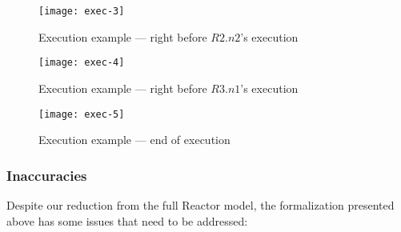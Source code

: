 \begin{figure}[!htbp]
\centering
\texttt{[image: exec-3]}
\caption{Execution example --- right before $R2.n2$'s execution}
\label{fig:exec-3}
\texttt{[image: exec-4]}
\caption{Execution example --- right before $R3.n1$'s execution}
\label{fig:exec-4}
\end{figure}

\begin{figure}[!htbp]
\centering
\texttt{[image: exec-5]}
\caption{Execution example --- end of execution}
\label{fig:exec-5}
\end{figure}

\break

\subsubsection{Inaccuracies}
\label{section:inaccuracies}

Despite our reduction from the full Reactor model, the formalization presented above has some issues that need to be addressed:

